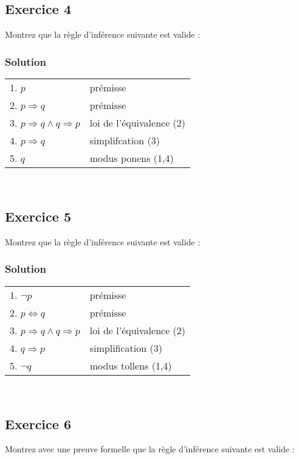 \subsection*{Exercice 4}
Montrez que la règle d'inférence suivante est valide :

\subsubsection*{Solution}

\begin{tabular}{|l|l|}
\hline
1. $p$ & prémisse \\
2. $ p \Rightarrow q $ & prémisse \\
3. $ p \Rightarrow q \land q \Rightarrow p$ & loi de l'équivalence (2)\\
4. $ p \Rightarrow q$ & simplifcation (3)\\
5. $ q$ & modus ponens (1,4)\\
\hline
\end{tabular}\\

\subsection*{Exercice 5}
Montrez que la règle d'inférence suivante est valide :


\subsubsection*{Solution}

\begin{tabular}{|l|l|}
\hline
1. $ \neg p $ & prémisse \\
2. $ p \Leftrightarrow q $ & prémisse \\
3. $ p \Rightarrow q \land q \Rightarrow p $ & loi de l'équivalence (2)  \\
4. $ q \Rightarrow p $ & simplification (3) \\
5. $ \neg q $ & modus tollens (1,4)\\
\hline
\end{tabular}\\

\newpage
\subsection*{Exercice 6}
Montrez avec une preuve formelle que la règle d'inférence suivante est valide :
